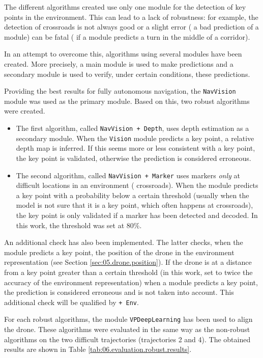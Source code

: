 The different algorithms created use only one module for the detection of key points in the environment. This can lead to a lack of robustness: for example, the detection of crossroads is not always good or a slight error (\eg{} a bad prediction of a module) can be fatal (\eg{} if a module predicts a turn in the middle of a corridor).

In an attempt to overcome this, algorithms using several modules have been created. More precisely, a main module is used to make predictions and a secondary module is used to verify, under certain conditions, these predictions.

Providing the best results for fully autonomous navigation, the \texttt{NavVision} module was used as the primary module. Based on this, two robust algorithms were created.

\begin{itemize}
    \item The first algorithm, called \texttt{NavVision + Depth}, uses depth estimation as a secondary module. When the \texttt{Vision} module predicts a key point, a relative depth map is inferred. If this seems more or less consistent with a key point, the key point is validated, otherwise the prediction is considered erroneous.
    \item The second algorithm, called \texttt{NavVision + Marker} uses markers \emph{only} at difficult locations in an environment (\eg{} crossroads). When the module predicts a key point with a probability below a certain threshold (usually when the model is not sure that it is a key point, which often happens at crossroads), the key point is only validated if a marker has been detected and decoded. In this work, the threshold was set at $80\%$.
\end{itemize}

An additional check has also been implemented. The latter checks, when the module predicts a key point, the position of the drone in the environment representation (see Section \ref{sec:05.drone.position}). If the drone is at a distance from a key point greater than a certain threshold (in this work, set to twice the accuracy of the environment representation) when a module predicts a key point, the prediction is considered erroneous and is not taken into account. This additional check will be qualified by \texttt{+ Env}.

For each robust algorithms, the module \texttt{VPDeepLearning} has been used to align the drone. These algorithms were evaluated in the same way as the non-robust algorithms on the two difficult trajectories (trajectories 2 and 4). The obtained results are shown in Table \ref{tab:06.evaluation.robust.results}.

